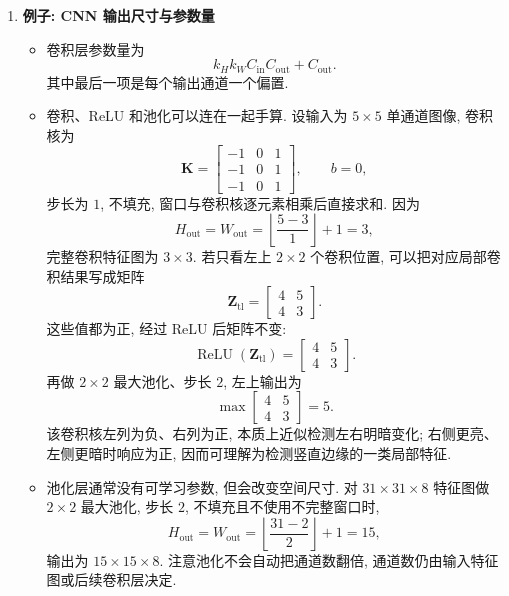 \documentclass{../nndlcourse}
\begin{document}
\begin{enumerate}
    \item \textbf{例子: CNN 输出尺寸与参数量}
    \begin{itemize}
        \item 卷积层参数量为
        \[
            k_H k_W C_{\mathrm{in}}C_{\mathrm{out}}+C_{\mathrm{out}}.
        \]
        其中最后一项是每个输出通道一个偏置.
        \item 卷积、ReLU 和池化可以连在一起手算. 设输入为 $5\times5$ 单通道图像, 卷积核为
        \[
            \boldsymbol{K}
            =
            \begin{bmatrix}
            -1&0&1\\
            -1&0&1\\
            -1&0&1
            \end{bmatrix},
            \qquad b=0,
        \]
        步长为 $1$, 不填充, 窗口与卷积核逐元素相乘后直接求和. 因为
        \[
            H_{\mathrm{out}}=W_{\mathrm{out}}
            =
            \left\lfloor\frac{5-3}{1}\right\rfloor+1=3,
        \]
        完整卷积特征图为 $3\times3$. 若只看左上 $2\times2$ 个卷积位置, 可以把对应局部卷积结果写成矩阵
        \[
            \boldsymbol{Z}_{\mathrm{tl}}
            =
            \begin{bmatrix}
            4 & 5\\
            4 & 3
            \end{bmatrix}.
        \]
        这些值都为正, 经过 ReLU 后矩阵不变:
        \[
            \operatorname{ReLU}(\boldsymbol{Z}_{\mathrm{tl}})
            =
            \begin{bmatrix}
            4 & 5\\
            4 & 3
            \end{bmatrix}.
        \]
        再做 $2\times2$ 最大池化、步长 $2$, 左上输出为
        \[
            \max
            \begin{bmatrix}
            4 & 5\\
            4 & 3
            \end{bmatrix}
            =
            5.
        \]
        该卷积核左列为负、右列为正, 本质上近似检测左右明暗变化; 右侧更亮、左侧更暗时响应为正, 因而可理解为检测竖直边缘的一类局部特征.
        \item 池化层通常没有可学习参数, 但会改变空间尺寸. 对 $31\times31\times8$ 特征图做 $2\times2$ 最大池化, 步长 $2$, 不填充且不使用不完整窗口时,
        \[
            H_{\mathrm{out}}=W_{\mathrm{out}}
            =
            \left\lfloor\frac{31-2}{2}\right\rfloor+1=15,
        \]
        输出为 $15\times15\times8$. 注意池化不会自动把通道数翻倍, 通道数仍由输入特征图或后续卷积层决定.

\end{itemize}
\end{enumerate}
\end{document}
